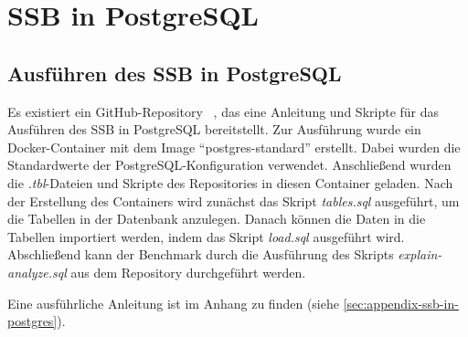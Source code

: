 \chapter{SSB in PostgreSQL}
\section{Ausführen des SSB in PostgreSQL}

Es existiert ein GitHub-Repository ~\cite{nukoyokohama_ssb-postgres_2023}, das eine Anleitung und Skripte für das Ausführen des \ac{SSB} in PostgreSQL bereitstellt.
Zur Ausführung wurde ein Docker-Container mit dem Image \enquote{postgres-standard} erstellt.
Dabei wurden die Standardwerte der PostgreSQL-Konfiguration verwendet.
Anschließend wurden die \emph{.tbl}-Dateien und Skripte des Repositories in diesen Container geladen. 
Nach der Erstellung des Containers wird zunächst das Skript \emph{tables.sql} ausgeführt, um die Tabellen in der Datenbank anzulegen.
Danach können die Daten in die Tabellen importiert werden, indem das Skript \emph{load.sql} ausgeführt wird.
Abschließend kann der Benchmark durch die Ausführung des Skripts \emph{explain-analyze.sql} aus dem Repository durchgeführt werden.

Eine ausführliche Anleitung ist im Anhang zu finden (siehe \cref{sec:appendix-ssb-in-postgres}).

